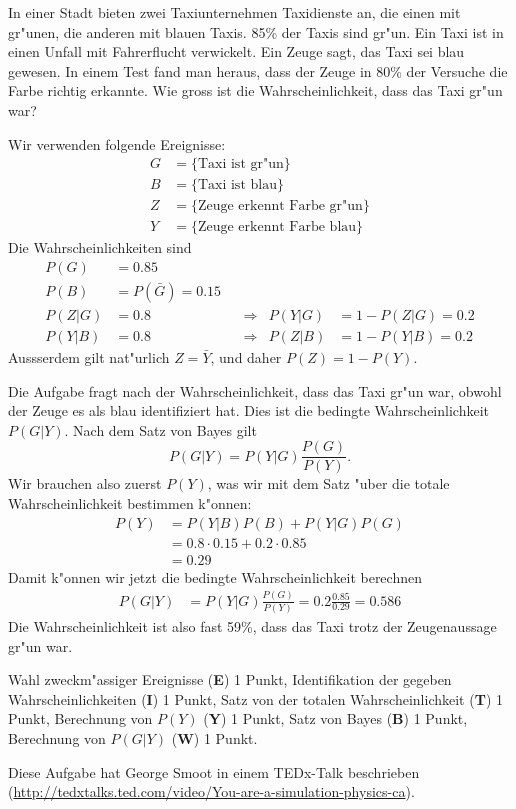 In einer Stadt bieten zwei Taxiunternehmen Taxidienste an, die einen mit
gr"unen, die anderen mit blauen Taxis. 85\% der Taxis sind gr"un.
Ein Taxi ist in einen Unfall mit Fahrerflucht verwickelt.
Ein Zeuge sagt, das Taxi sei blau gewesen.
In einem Test fand man heraus, dass der Zeuge in 80\% der Versuche
die Farbe richtig erkannte.
Wie gross ist die Wahrscheinlichkeit, dass das Taxi gr"un war?

\begin{loesung}
Wir verwenden folgende Ereignisse:
\begin{align*}
G&=\{\text{Taxi ist gr"un}\}\\
B&=\{\text{Taxi ist blau}\}\\
Z&=\{\text{Zeuge erkennt Farbe gr"un}\}\\
Y&=\{\text{Zeuge erkennt Farbe blau}\}
\end{align*}
Die Wahrscheinlichkeiten sind
\begin{align*}
P(G)&=0.85\\
P(B)&=P(\bar G)=0.15\\
P(Z|G)&=0.8 &&\Rightarrow& P(Y|G)&=1-P(Z|G)=0.2\\
P(Y|B)&=0.8 &&\Rightarrow& P(Z|B)&=1-P(Y|B)=0.2
\end{align*}
Aussserdem gilt nat"urlich $Z=\bar Y$, und daher $P(Z)=1-P(Y)$.

Die Aufgabe fragt nach der Wahrscheinlichkeit, dass das Taxi gr"un war,
obwohl der Zeuge es als blau identifiziert hat.
Dies ist die bedingte Wahrscheinlichkeit $P(G|Y)$. Nach dem Satz von
Bayes gilt
\[
P(G|Y)=P(Y|G)\frac{P(G)}{P(Y)}.
\]
Wir brauchen also zuerst $P(Y)$, was wir mit dem Satz "uber die totale
Wahrscheinlichkeit bestimmen k"onnen:
\begin{align*}
P(Y)
&=
P(Y|B)P(B) + P(Y|G)P(G)\\
&=
0.8 \cdot 0.15 + 0.2 \cdot 0.85\\
&=0.29
\end{align*}
Damit k"onnen wir jetzt die bedingte Wahrscheinlichkeit berechnen
\begin{align*}
P(G|Y)
&=
P(Y|G)\frac{P(G)}{P(Y)}
=
0.2\frac{0.85}{0.29}
=
0.586
\end{align*}
Die Wahrscheinlichkeit ist also fast 59\%, dass das Taxi trotz der
Zeugenaussage gr"un war.
\end{loesung}

\begin{bewertung}
Wahl zweckm"assiger Ereignisse ({\bf E}) 1 Punkt,
Identifikation der gegeben Wahrscheinlichkeiten ({\bf I}) 1 Punkt,
Satz von der totalen Wahrscheinlichkeit ({\bf T}) 1 Punkt,
Berechnung von $P(Y)$ ({\bf Y}) 1 Punkt,
Satz von Bayes ({\bf B}) 1 Punkt,
Berechnung von $P(G|Y)$ ({\bf W}) 1 Punkt.
\end{bewertung}

\begin{diskussion}
Diese Aufgabe hat George Smoot in einem TEDx-Talk beschrieben
(\url{http://tedxtalks.ted.com/video/You-are-a-simulation-physics-ca}).
\end{diskussion}

